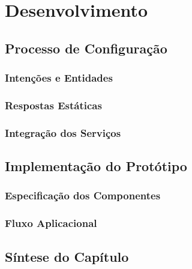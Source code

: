\chapter{Desenvolvimento}
\label{chap:Chapter5}
\tbd

\section{Processo de Configuração}
\label{sec:chap05_configprocess}
\tbd

\subsection{Intenções e Entidades}
\tbd

\subsection{Respostas Estáticas}
\tbd

\subsection{Integração dos Serviços}
\tbd

\section{Implementação do Protótipo}
\label{sec:chap05_prototypeimplementation}
\tbd

\subsection{Especificação dos Componentes}
\tbd

\subsection{Fluxo Aplicacional}
\tbd

\section{Síntese do Capítulo}
\label{sec:chap05_chaptersummary}